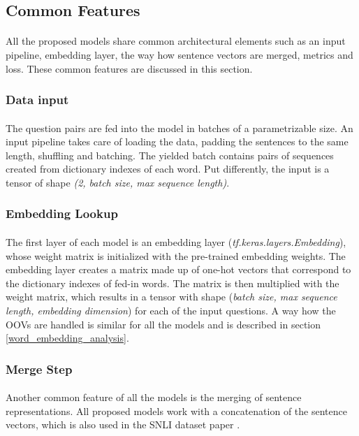 \subsection{Common Features}
\paragraph{}
All the proposed models share common architectural elements such as an input pipeline, embedding layer, the way how sentence vectors are merged, metrics and loss. These common features are discussed in this section.

\subsubsection{Data input}
\paragraph{}
The question pairs are fed into the model in batches of a parametrizable size. An input pipeline takes care of loading the data, padding the sentences to the same length, shuffling and batching. The yielded batch contains pairs of sequences created from dictionary indexes of each word. Put differently, the input is a tensor of shape \textit{(2, batch size, max sequence length)}.

\subsubsection{Embedding Lookup}
\paragraph{}
The first layer of each model is an embedding layer (\textit{tf.keras.layers.Embedding}), whose weight matrix is initialized with the pre-trained embedding weights. The embedding layer creates a matrix made up of one-hot vectors that correspond to the dictionary indexes of fed-in words. The matrix is then multiplied with the weight matrix, which results in a tensor with shape (\textit{batch size, max sequence length, embedding dimension}) for each of the input questions. A way how the OOVs are handled is similar for all the models and is described in section \ref{word_embedding_analysis}.

\subsubsection{Merge Step}
\paragraph{}
Another common feature of all the models is the merging of sentence representations. All proposed models work with a concatenation of the sentence vectors, which is also used in the SNLI dataset paper \cite{snli}.

